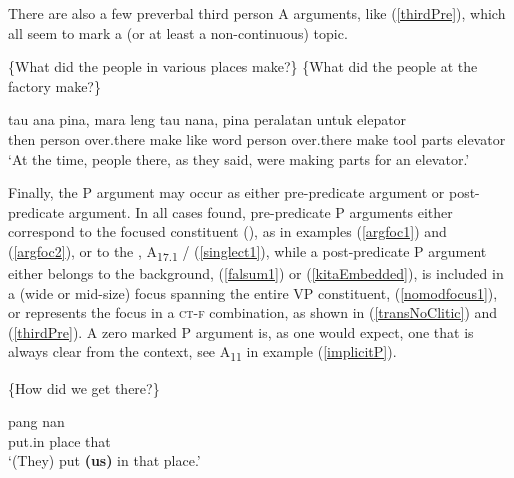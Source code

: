 \documentclass[output=paper
,modfonts
,nonflat]{langsci/langscibook}
\begin{document}
\noindent There are also a few preverbal third person A arguments, like (\ref{thirdPre}), which all seem to mark a  (or at least a non-continuous) topic. 

\begin{exe}
	\ex\label{thirdPre}
	\begin{xlist}
		 {\{What did the people in various places make?\}}
		 {\{What did the people at the factory make?\}}
	\end{xlist}
	\begin{xlist}[≫ A\textsubscript{{1.1}}:]
		\exi{≫ A\textsubscript{{1.1}}:} 
		 tau {{\ob}ana{\cb}\ctopic} pina, {{\ob}mara} leng tau {nana,{\cb}\nai} pina {{\ob}peralatan} untuk {elepator{\cb}\focus{\cb}\sq}\\
		\hphantom{[}then person \hphantom{[}over.there make \hphantom{[}like word person over.there make \hphantom{[}tool parts elevator\\
		\glt `At the time, people there, as they said, were making parts for an elevator.'
	\end{xlist}
\end{exe}

\noindent Finally, the P argument may occur as either pre-predicate argument or post-predicate argument. In all cases found, pre-predicate P arguments either correspond to the focused constituent (), as in examples (\ref{argfoc1}) and (\ref{argfoc2}), or to the , A\textsubscript{{17.1}} / (\ref{singlect1}), while a post-predicate P argument either belongs to the background, (\ref{falsum1}) or (\ref{kitaEmbedded}), is included in a (wide or mid-size) focus spanning the entire VP constituent, (\ref{nomodfocus1}), or represents the focus in a \textsc{ct-f} combination, as shown in (\ref{transNoClitic}) and (\ref{thirdPre}). A zero marked P argument is, as one would expect, one that is always clear from the context, see A\textsubscript{{11}} in example (\ref{implicitP}).

\begin{exe}
	\ex\label{implicitP}
	\begin{xlist}
		 \{How did we get there?\}
	\end{xlist}
	\begin{xlist}[> A\textsubscript{{11}}:]
		\exi{> A\textsubscript{{11}}:}
		 {{\ob}pang} {nan{\cb}\topic{\cb}\sq}\\
		put.in place that\\
		\glt `(They) put  \textbf{(us)} in that place.'
	\end{xlist}
\end{exe}
\end{document}
